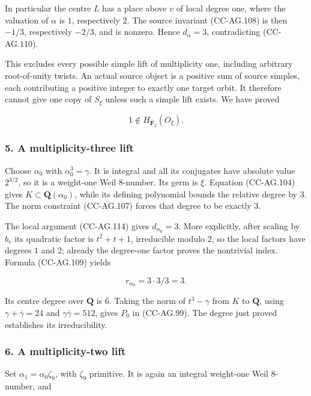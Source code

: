 In particular the centre \(L\) has a place above \(v\) of local degree
one, where the valuation of \(\alpha\) is \(1\), respectively \(2\). The
source invariant (CC-AG.108) is then \(-1/3\), respectively \(-2/3\),
and is nonzero. Hence \(d_\alpha=3\), contradicting (CC-AG.110).

This excludes every possible simple lift of multiplicity one, including
arbitrary root-of-unity twists. An actual source object is a positive
sum of source simples, each contributing a positive integer to exactly
one target orbit. It therefore cannot give one copy of \(S_\xi\) unless
such a simple lift exists. We have proved

\[
 1\notin H_{\bar{\mathbf F}_2}(O_\xi).
 \tag{CC-AG.115}
\]

\subsubsection{5. A multiplicity-three
lift}\label{a-multiplicity-three-lift}

Choose \(\alpha_0\) with \(\alpha_0^3=\gamma\). It is integral and all
its conjugates have absolute value \(2^{3/2}\), so it is a weight-one
Weil \(8\)-number. Its germ is \(\xi\). Equation (CC-AG.104) gives
\(K\subset\mathbf Q(\alpha_0)\), while its defining polynomial bounds
the relative degree by \(3\). The norm constraint (CC-AG.107) forces
that degree to be exactly \(3\).

The local argument (CC-AG.114) gives \(d_{\alpha_0}=3\). More
explicitly, after scaling by \(b_v\) its quadratic factor is
\(t^2+t+1\), irreducible modulo \(2\), so the local factors have degrees
\(1\) and \(2\); already the degree-one factor proves the nontrivial
index. Formula (CC-AG.109) yields

\[
 r_{\alpha_0}=3\cdot3/3=3.
 \tag{CC-AG.116}
\]

Its centre degree over \(\mathbf Q\) is \(6\). Taking the norm of
\(t^3-\gamma\) from \(K\) to \(\mathbf Q\), using
\(\gamma+\bar\gamma=24\) and \(\gamma\bar\gamma=512\), gives \(P_0\) in
(CC-AG.99). The degree just proved establishes its irreducibility.

\subsubsection{6. A multiplicity-two
lift}\label{a-multiplicity-two-lift}

Set \(\alpha_1=\alpha_0\zeta_9\), with \(\zeta_9\) primitive. It is
again an integral weight-one Weil \(8\)-number, and

